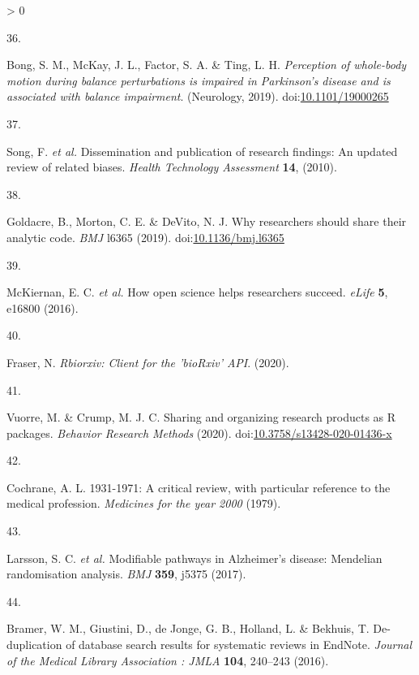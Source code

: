 \documentclass[a4paper, twoside]{templates/ociamthesis}
\newlength{\cslhangindent}
\newlength{\csllabelwidth}
\newenvironment{CSLReferences}[3] %
 {%
  \setlength{\parindent}{0pt}
  \ifodd #1 \everypar{\setlength{\hangindent}{\cslhangindent}}\ignorespaces\fi
  \ifnum #2 > 0
  \setlength{\parskip}{#2\baselineskip}
  \fi
 }%
 {}
\newcommand{\CSLLeftMargin}[1]{\parbox[t]{\maxof{\widthof{#1}}{\csllabelwidth}}{#1}}
\newcommand{\CSLRightInline}[1]{\parbox[t]{\linewidth - \csllabelwidth}{#1}}
\begin{document}
\begin{CSLReferences}{0}{0}
\leavevmode\hypertarget{ref-bong2019}{}%
\CSLLeftMargin{36. }
\CSLRightInline{Bong, S. M., McKay, J. L., Factor, S. A. \& Ting, L. H. \emph{Perception of whole-body motion during balance perturbations is impaired in {Parkinson}'s disease and is associated with balance impairment}. ({Neurology}, 2019). doi:\href{https://doi.org/10.1101/19000265}{10.1101/19000265}}

\leavevmode\hypertarget{ref-song2010}{}%
\CSLLeftMargin{37. }
\CSLRightInline{Song, F. \emph{et al.} Dissemination and publication of research findings: An updated review of related biases. \emph{Health Technology Assessment} \textbf{14}, (2010).}

\leavevmode\hypertarget{ref-goldacre2019b}{}%
\CSLLeftMargin{38. }
\CSLRightInline{Goldacre, B., Morton, C. E. \& DeVito, N. J. Why researchers should share their analytic code. \emph{BMJ} l6365 (2019). doi:\href{https://doi.org/10.1136/bmj.l6365}{10.1136/bmj.l6365}}

\leavevmode\hypertarget{ref-mckiernan2016c}{}%
\CSLLeftMargin{39. }
\CSLRightInline{McKiernan, E. C. \emph{et al.} How open science helps researchers succeed. \emph{eLife} \textbf{5}, e16800 (2016).}

\leavevmode\hypertarget{ref-rbiorxiv}{}%
\CSLLeftMargin{40. }
\CSLRightInline{Fraser, N. \emph{Rbiorxiv: {Client} for the '{bioRxiv}' {API}}. (2020).}

\leavevmode\hypertarget{ref-vuorre2020}{}%
\CSLLeftMargin{41. }
\CSLRightInline{Vuorre, M. \& Crump, M. J. C. Sharing and organizing research products as {R} packages. \emph{Behavior Research Methods} (2020). doi:\href{https://doi.org/10.3758/s13428-020-01436-x}{10.3758/s13428-020-01436-x}}

\leavevmode\hypertarget{ref-cochrane20001931}{}%
\CSLLeftMargin{42. }
\CSLRightInline{Cochrane, A. L. 1931-1971: A critical review, with particular reference to the medical profession. \emph{Medicines for the year 2000} (1979).}

\leavevmode\hypertarget{ref-larsson2017b}{}%
\CSLLeftMargin{43. }
\CSLRightInline{Larsson, S. C. \emph{et al.} Modifiable pathways in {Alzheimer}'s disease: {Mendelian} randomisation analysis. \emph{BMJ} \textbf{359}, j5375 (2017).}

\leavevmode\hypertarget{ref-bramer2016}{}%
\CSLLeftMargin{44. }
\CSLRightInline{Bramer, W. M., Giustini, D., de Jonge, G. B., Holland, L. \& Bekhuis, T. De-duplication of database search results for systematic reviews in {EndNote}. \emph{Journal of the Medical Library Association : JMLA} \textbf{104}, 240--243 (2016).}


\end{CSLReferences}
\end{document}
